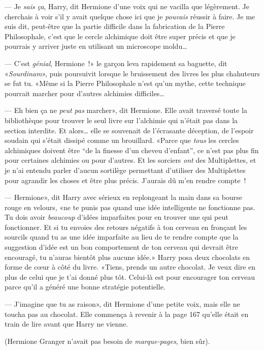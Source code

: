 --- Je \emph{sais ça}, Harry, dit Hermione d'une voix qui ne vacilla que légèrement. Je cherchais à voir s'il y avait quelque chose ici que je \emph{pouvais} réussir à faire. Je me suis dit, peut-être que la partie difficile dans la fabrication de la Pierre Philosophale, c'est que le cercle alchimique doit être super précis et que je pourrais y arriver juste en utilisant un microscope moldu…

--- C'est \emph{génial}, Hermione~!» le garçon leva rapidement sa baguette, dit «\emph{Sourdinam}», puis poursuivit lorsque le bruissement des livres les plus chahuteurs se fut tu. «Même si la Pierre Philosophale n'est qu'un mythe, cette technique pourrait marcher pour d'autres alchimies difficiles…

--- Eh bien ça ne \emph{peut pas} marcher», dit Hermione. Elle avait traversé toute la bibliothèque pour trouver le seul livre sur l'alchimie qui n'était pas dans la section interdite. Et alors… elle se souvenait de l'écrasante déception, de l'espoir soudain qui s'était dissipé comme un brouillard. «Parce que \emph{tous} les cercles alchimiques doivent être “de la finesse d'un cheveu d'enfant”, ce n'est pas plus fin pour certaines alchimies ou pour d'autres. Et les sorciers \emph{ont} des Multiplettes, et je n'ai entendu parler d'aucun sortilège permettant d'utiliser des Multiplettes pour agrandir les choses et être plus précis. J'aurais dû m'en rendre compte~!

--- Hermione», dit Harry avec sérieux en replongeant la main dans sa bourse rouge en velours, «ne te punis pas quand une idée intelligente ne fonctionne pas. Tu dois avoir \emph{beaucoup} d'idées imparfaites pour en trouver une qui peut fonctionner. Et si tu envoies des retours négatifs à ton cerveau en fronçant les sourcils quand tu as une idée imparfaite au lieu de te rendre compte que la suggestion d'idée est un bon comportement de ton cerveau qui devrait être encouragé, tu n'auras bientôt plus aucune idée.» Harry posa deux chocolats en forme de cœur à côté du livre. «Tiens, prends un autre chocolat. Je veux dire en plus de celui que je t'ai donné plus tôt. Celui-là est pour encourager ton cerveau parce qu'il a généré une bonne stratégie potentielle.

--- J'imagine que tu as raison», dit Hermione d'une petite voix, mais elle ne toucha pas au chocolat. Elle commença à revenir à la page 167 qu'elle était en train de lire avant que Harry ne vienne.

(Hermione Granger n'avait pas besoin de \emph{marque-pages}, bien sûr).

